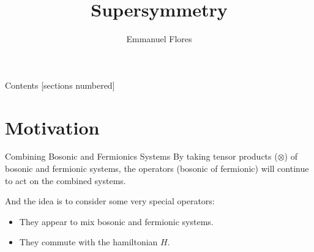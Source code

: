\documentclass[12pt]{beamer}
\title{Supersymmetry}
\author{Emmanuel Flores}
\institute{Advanced Mathematical Methods, \\Tufts University}
\begin{document}
\maketitle
\begin{frame}{Contents}
	[sections numbered]
	\tableofcontents
\end{frame}
\section[Motivation]{Motivation}
\begin{frame}{Combining Bosonic and Fermionics Systems}
By taking tensor products ($\otimes$) of bosonic and fermionic systems, the operators (bosonic of fermionic) will  continue to act on the combined systems.

And the idea is to consider some very special operators:
\begin{itemize}
	\item They appear to mix bosonic and fermionic systems.
	\item They commute with the hamiltonian $H$.
\end{itemize}
\end{frame}
\end{document}
